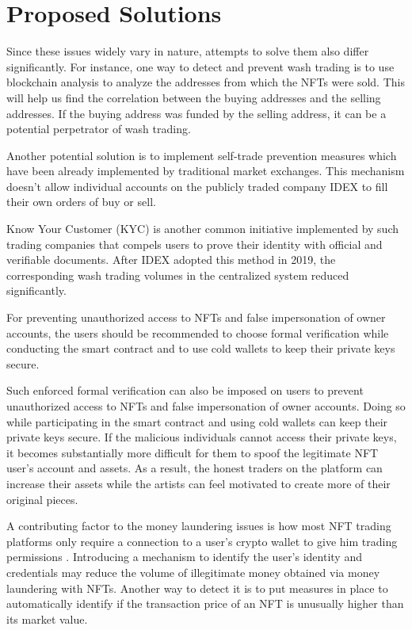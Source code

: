 \documentclass[12pt]{article}
\begin{document}
\section{Proposed Solutions}
{\color{blue} Since these issues widely vary in nature, attempts to solve them also differ significantly. For instance, one way to detect and prevent wash trading is to use blockchain analysis to analyze the addresses from which the NFTs were sold. This will help us find the correlation between the buying addresses and the selling addresses. If the buying address was funded by the selling address, it can be a potential perpetrator of wash trading.

Another potential solution is to implement self-trade prevention measures which have been already implemented by traditional market exchanges. \cite{victor2021detecting} This mechanism doesn’t allow individual accounts on the publicly traded company IDEX to fill their own orders of buy or sell. 

Know Your Customer (KYC) is another common initiative implemented by such trading companies that compels users to prove their identity with official and verifiable documents. After IDEX adopted this method in 2019, the corresponding wash trading volumes in the centralized system reduced significantly. \cite{victor2021detecting}

For preventing unauthorized access to NFTs and false impersonation of owner accounts, the users should be recommended to choose formal verification while conducting the smart contract and to use cold wallets to keep their private keys secure.}

Such enforced formal verification can also be imposed on users to prevent unauthorized access to NFTs and false impersonation of owner accounts. Doing so while participating in the smart contract and using cold wallets can keep their private keys secure. If the malicious individuals cannot access their private keys, it becomes substantially more difficult for them to spoof the legitimate NFT user's account and assets. As a result, the honest traders  on the platform can increase their assets while the artists can feel motivated to create more of their original pieces.

A contributing factor to the money laundering issues is how most NFT trading platforms only require a connection to a user’s crypto wallet to give him trading permissions \cite{treasurydepartment}. Introducing a mechanism to identify the user’s identity and credentials may reduce the volume of illegitimate money obtained via money laundering with NFTs. Another way to detect it is to put measures in place to automatically identify if the transaction price of an NFT is unusually higher than its market value. 
\end{document}
